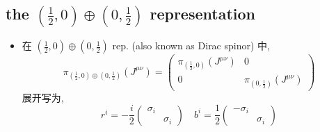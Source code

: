 \subsection{the \texorpdfstring{$(\frac{1}{2}, 0) \oplus (0, \frac{1}{2})$}{(1/2, 0)+(0, 1/2)} representation} \label{subsection 13.5.2}
\begin{itemize}
	\item 在 $(\frac{1}{2}, 0) \oplus (0, \frac{1}{2})$ rep. (also known as Dirac spinor) 中,
	\begin{equation}
		\pi_{(\frac{1}{2}, 0) \oplus (0, \frac{1}{2})}(J^{\mu \nu}) = \begin{pmatrix}
			\pi_{(\frac{1}{2}, 0)}(J^{\mu \nu}) & 0 \\
			0 & \pi_{(0, \frac{1}{2})}(J^{\mu \nu})
		\end{pmatrix}
	\end{equation}
	展开写为,
	\begin{equation}
		r^i = - \frac{i}{2} \begin{pmatrix}
			\sigma_i & \\
			& \sigma_i
		\end{pmatrix} \quad b^i = \frac{1}{2} \begin{pmatrix}
			- \sigma_i & \\
			& \sigma_i
		\end{pmatrix}
	\end{equation}
\end{itemize}

